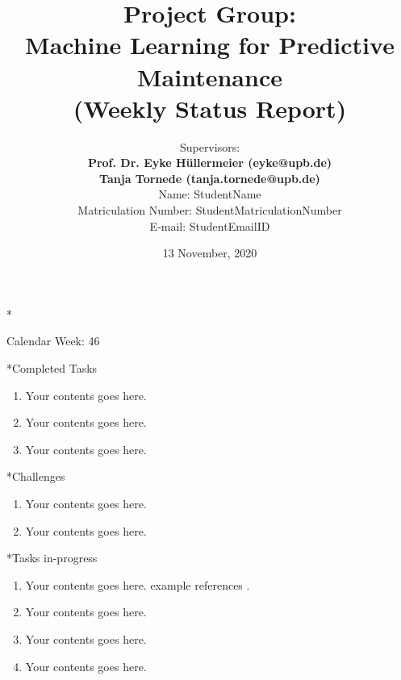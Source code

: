 \documentclass[11pt,a4paper]{article}
\title{Project Group:\\
\textbf{Machine Learning for Predictive Maintenance}\\
(Weekly Status Report)}
\author{Supervisors:\\
\textbf{Prof. Dr. Eyke H{\"u}llermeier (eyke@upb.de)}\\
\textbf{Tanja Tornede (tanja.tornede@upb.de)}\\ 
\vspace{10mm}
Name: StudentName \\
Matriculation Number: StudentMatriculationNumber\\
E-mail: StudentEmailID
}
\date{}
\begin{document}
\maketitle
\thispagestyle{empty}

\clearpage
{}

\newpage
\begin{section}*{Calendar Week: 46 \hfill \date{13 November, 2020}}
 \begin{refsection}

       \begin{subsection}*{Completed Tasks}
             \begin{enumerate}
                   \item
                         Your contents goes here.
                   \item
                         Your contents goes here.
                   \item
                         Your contents goes here.
             \end{enumerate}
       \end{subsection}

       \begin{subsection}*{Challenges}
             \begin{enumerate}
                   \item
                         Your contents goes here.
                   \item
                         Your contents goes here.
             \end{enumerate}
       \end{subsection}

       \begin{subsection}*{Tasks in-progress}
             \begin{enumerate}
                   \item
                         Your contents goes here. example references \cite{DBLP:journals/sj/ZhangYW19}.
                   \item
                         Your contents goes here.
                   \item
                         Your contents goes here.
                   \item
                         Your contents goes here.
             \end{enumerate}
       \end{subsection}

       \printbibliography
 \end{refsection}
\end{section}
\end{document}
